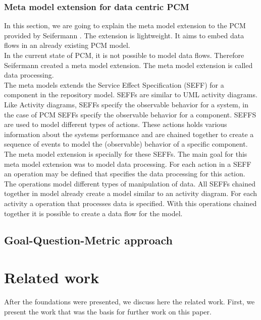 \subsection{Meta model extension for data centric PCM}
\label{MMext}
In this section, we are going to explain the meta model extension to the PCM provided by Seifermann \cite{MMextension}. The extension is lightweight. It aims to embed data flows in an already existing PCM model.\\ 
In the current state of PCM, it is not possible to model data flows. Therefore Seifermann created a meta model extension. The meta model extension is called data processing. \\
The meta models extends the Service Effect Specification (SEFF) for a component in the repository model. SEFFs are similar to UML activity diagrams. Like Activity diagrams, SEFFs specify the observable behavior for a system, in the case of PCM SEFFs specify the observable behavior for a component. SEFFS are used to model different types of actions. These actions holds various information about the systems performance and are chained together to create a sequence of events to model the (observable) behavior of a specific component.\\ The meta model extension is specially for these SEFFs. The main goal for this meta model extension was to model data processing.  For each action in a SEFF an operation may be defined that specifies the data processing for this action. The operations model different types of manipulation of data. All SEFFs chained together in model already create a model similar to an activity diagram. For each activity a operation that processes data is specified. With this operations chained together it is possible to create a data flow for the model. 
\section{Goal-Question-Metric approach}


\chapter{Related work}
After the foundations were presented, we discuss here the related work.  First, we present the work that was the basis for further work on this paper.


